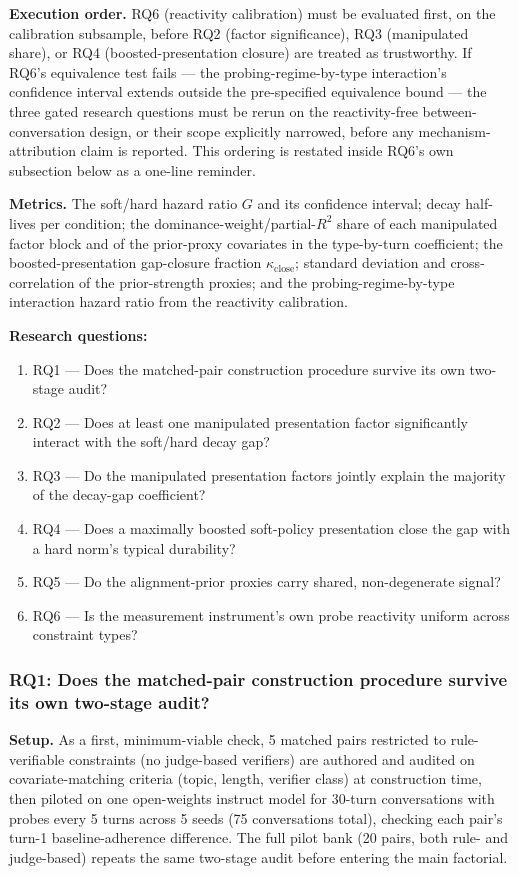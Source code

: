 \documentclass[11pt]{article}
\begin{document}
\textbf{Execution order.} RQ6 (reactivity calibration) must be evaluated first, on the calibration subsample, before RQ2 (factor significance), RQ3 (manipulated share), or RQ4 (boosted-presentation closure) are treated as trustworthy. If RQ6's equivalence test fails --- the probing-regime-by-type interaction's confidence interval extends outside the pre-specified equivalence bound --- the three gated research questions must be rerun on the reactivity-free between-conversation design, or their scope explicitly narrowed, before any mechanism-attribution claim is reported. This ordering is restated inside RQ6's own subsection below as a one-line reminder.

\textbf{Metrics.} The soft/hard hazard ratio $G$ and its confidence interval; decay half-lives per condition; the dominance-weight/partial-$R^2$ share of each manipulated factor block and of the prior-proxy covariates in the type-by-turn coefficient; the boosted-presentation gap-closure fraction $\kappa_{\text{close}}$; standard deviation and cross-correlation of the prior-strength proxies; and the probing-regime-by-type interaction hazard ratio from the reactivity calibration.

\textbf{Research questions:}
\begin{enumerate}[leftmargin=1.6em]
\item RQ1 --- Does the matched-pair construction procedure survive its own two-stage audit?
\item RQ2 --- Does at least one manipulated presentation factor significantly interact with the soft/hard decay gap?
\item RQ3 --- Do the manipulated presentation factors jointly explain the majority of the decay-gap coefficient?
\item RQ4 --- Does a maximally boosted soft-policy presentation close the gap with a hard norm's typical durability?
\item RQ5 --- Do the alignment-prior proxies carry shared, non-degenerate signal?
\item RQ6 --- Is the measurement instrument's own probe reactivity uniform across constraint types?
\end{enumerate}

\subsubsection{RQ1: Does the matched-pair construction procedure survive its own two-stage audit?}
\textbf{Setup.} As a first, minimum-viable check, 5 matched pairs restricted to rule-verifiable constraints (no judge-based verifiers) are authored and audited on covariate-matching criteria (topic, length, verifier class) at construction time, then piloted on one open-weights instruct model for 30-turn conversations with probes every 5 turns across 5 seeds (75 conversations total), checking each pair's turn-1 baseline-adherence difference. The full pilot bank (20 pairs, both rule- and judge-based) repeats the same two-stage audit before entering the main factorial.
\end{document}
